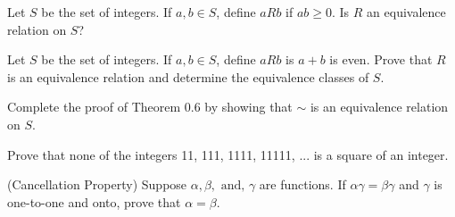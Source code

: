 \documentclass[11pt,largemargins]{homework}
\begin{document}
\question 
Let $S$ be the set of integers. If $a,b \in S$, define $aRb$ if $ab\geq 0$. Is $R$ an equivalence relation on $S$?

\question 
Let $S$ be the set of integers. If $a,b \in S$, define $aRb$ is $a+b$ is even. Prove that $R$ is an equivalence relation 
and determine the equivalence classes of $S$.

\question
Complete the proof of Theorem 0.6 by showing that $\sim$ is an equivalence relation on $S$.

\question 
Prove that none of the integers 11, 111, 1111, 11111, ... is a square of an integer.

\question 
(Cancellation Property) Suppose $\alpha, \beta, \text{ and, } \gamma$ are functions. If $\alpha\gamma=\beta\gamma$ and $\gamma$ 
is one-to-one and onto, prove that $\alpha=\beta$.
\end{document}
